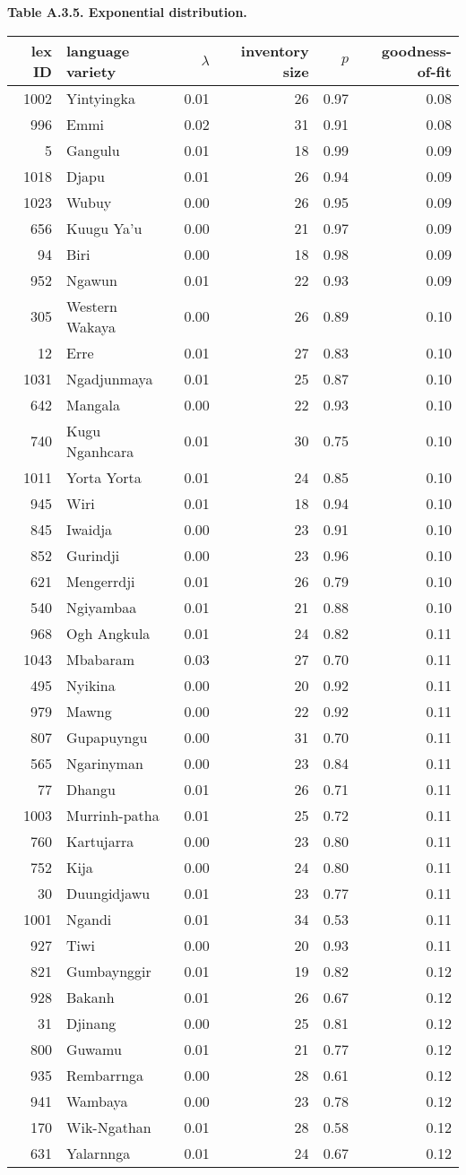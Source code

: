 \newpage

\textbf{Table A.3.5. Exponential distribution.}

\begin{longtable}[]{@{}rlrrrr@{}}
\toprule
\textbf{lex ID} & \textbf{language variety} & \(\lambda\) &
\textbf{inventory size} & \(p\) &
\textbf{goodness-of-fit}\tabularnewline
\midrule
\endhead
1002 & Yintyingka & 0.01 & 26 & 0.97 & 0.08\tabularnewline
996 & Emmi & 0.02 & 31 & 0.91 & 0.08\tabularnewline
5 & Gangulu & 0.01 & 18 & 0.99 & 0.09\tabularnewline
1018 & Djapu & 0.01 & 26 & 0.94 & 0.09\tabularnewline
1023 & Wubuy & 0.00 & 26 & 0.95 & 0.09\tabularnewline
656 & Kuugu Ya'u & 0.00 & 21 & 0.97 & 0.09\tabularnewline
94 & Biri & 0.00 & 18 & 0.98 & 0.09\tabularnewline
952 & Ngawun & 0.01 & 22 & 0.93 & 0.09\tabularnewline
305 & Western Wakaya & 0.00 & 26 & 0.89 & 0.10\tabularnewline
12 & Erre & 0.01 & 27 & 0.83 & 0.10\tabularnewline
1031 & Ngadjunmaya & 0.01 & 25 & 0.87 & 0.10\tabularnewline
642 & Mangala & 0.00 & 22 & 0.93 & 0.10\tabularnewline
740 & Kugu Nganhcara & 0.01 & 30 & 0.75 & 0.10\tabularnewline
1011 & Yorta Yorta & 0.01 & 24 & 0.85 & 0.10\tabularnewline
945 & Wiri & 0.01 & 18 & 0.94 & 0.10\tabularnewline
845 & Iwaidja & 0.00 & 23 & 0.91 & 0.10\tabularnewline
852 & Gurindji & 0.00 & 23 & 0.96 & 0.10\tabularnewline
621 & Mengerrdji & 0.01 & 26 & 0.79 & 0.10\tabularnewline
540 & Ngiyambaa & 0.01 & 21 & 0.88 & 0.10\tabularnewline
968 & Ogh Angkula & 0.01 & 24 & 0.82 & 0.11\tabularnewline
1043 & Mbabaram & 0.03 & 27 & 0.70 & 0.11\tabularnewline
495 & Nyikina & 0.00 & 20 & 0.92 & 0.11\tabularnewline
979 & Mawng & 0.00 & 22 & 0.92 & 0.11\tabularnewline
807 & Gupapuyngu & 0.00 & 31 & 0.70 & 0.11\tabularnewline
565 & Ngarinyman & 0.00 & 23 & 0.84 & 0.11\tabularnewline
77 & Dhangu & 0.01 & 26 & 0.71 & 0.11\tabularnewline
1003 & Murrinh-patha & 0.01 & 25 & 0.72 & 0.11\tabularnewline
760 & Kartujarra & 0.00 & 23 & 0.80 & 0.11\tabularnewline
752 & Kija & 0.00 & 24 & 0.80 & 0.11\tabularnewline
30 & Duungidjawu & 0.01 & 23 & 0.77 & 0.11\tabularnewline
1001 & Ngandi & 0.01 & 34 & 0.53 & 0.11\tabularnewline
927 & Tiwi & 0.00 & 20 & 0.93 & 0.11\tabularnewline
821 & Gumbaynggir & 0.01 & 19 & 0.82 & 0.12\tabularnewline
928 & Bakanh & 0.01 & 26 & 0.67 & 0.12\tabularnewline
31 & Djinang & 0.00 & 25 & 0.81 & 0.12\tabularnewline
800 & Guwamu & 0.01 & 21 & 0.77 & 0.12\tabularnewline
935 & Rembarrnga & 0.00 & 28 & 0.61 & 0.12\tabularnewline
941 & Wambaya & 0.00 & 23 & 0.78 & 0.12\tabularnewline
170 & Wik-Ngathan & 0.01 & 28 & 0.58 & 0.12\tabularnewline
631 & Yalarnnga & 0.01 & 24 & 0.67 & 0.12\tabularnewline

\end{longtable}
